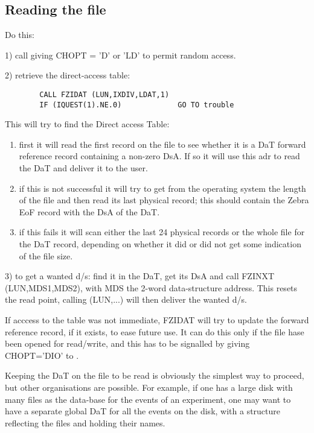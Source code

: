 {\subsection*{Reading the file}

Do this:

1) call  giving CHOPT = 'D' or 'LD' to permit random access.

2) retrieve the direct-access table:
\begin{verbatim}
        CALL FZIDAT (LUN,IXDIV,LDAT,1)
        IF (IQUEST(1).NE.0)             GO TO trouble
\end{verbatim}
   \hspace*{4mm} This will try to find the Direct access Table:
\begin{enumerate}
\item first it will read the first record on the file to see whether
      it is a DaT forward reference record containing a non-zero DsA.
      If so it will use this adr to read the DaT and deliver it to the user.
\item if this is not successful it will try to get from the operating
      system the length of the file and then read its last physical record;
      this should contain the Zebra EoF record with the DsA of the DaT.
\item if this fails it will scan either the last 24 physical records
      or the whole file for the DaT record, depending on whether
      it did or did not get some indication of the file size.
\end{enumerate}

3) to get a wanted d/s: find it in the DaT, get its DsA
and call FZINXT (LUN,MDS1,MDS2),
with MDS the 2-word data-structure address.
This resets the read point, calling  (LUN,...) will then
deliver the wanted d/s.

\vspace*{12pt}
If acccess to the table was not immediate,
FZIDAT will try to update the forward reference record, if it exists,
to ease future use.
It can do this only if the file hase been opened for read/write,
and this has to be signalled by giving CHOPT='DIO' to .

\vspace*{12pt}
Keeping the DaT on the file to be read is obviously the simplest
way to proceed, but other organisations are possible.
For example, if one has a large disk with many files as the
data-base for the events of an experiment,
one may want to have a separate global DaT
for all the events on the disk,
with a structure reflecting the files and holding their names.

}
